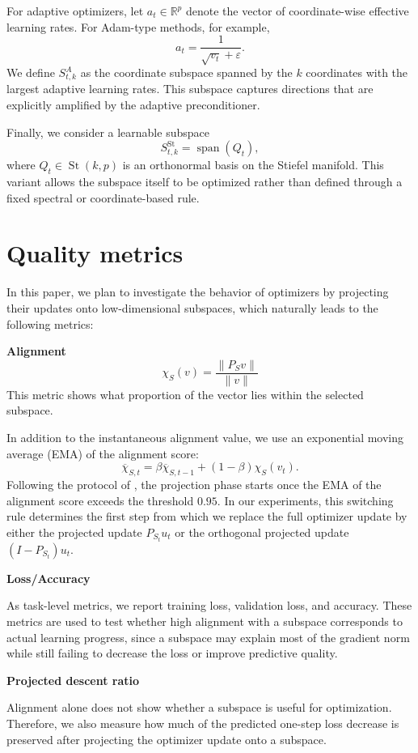 \documentclass[conference]{IEEEtran}
\begin{document}
For adaptive optimizers, let $a_t \in \mathbb{R}^p$ denote the vector of coordinate-wise effective learning rates. For Adam-type methods, for example,
\[
a_t = \frac{1}{\sqrt{v_t} + \varepsilon}.
\]
We define $S_{t,k}^{A}$ as the coordinate subspace spanned by the $k$ coordinates with the largest adaptive learning rates. This subspace captures directions that are explicitly amplified by the adaptive preconditioner.

Finally, we consider a learnable subspace
\[
S_{t,k}^{\mathrm{St}} = \operatorname{span}(Q_t),
\]
where $Q_t \in \operatorname{St}(k,p)$ is an orthonormal basis on the Stiefel manifold. This variant allows the subspace itself to be optimized rather than defined through a fixed spectral or coordinate-based rule.




\section{Quality metrics}

In this paper, we plan to investigate the behavior of optimizers by projecting their updates onto low-dimensional subspaces, which naturally leads to the following metrics:

\textbf{Alignment}
\[
\chi_S(v) = \frac{\|P_S v\|}{\|v\|}
\]
This metric shows what proportion of the vector lies within the selected subspace.

In addition to the instantaneous alignment value, we use an exponential moving average (EMA) of the alignment score:
\[
\overline{\chi}_{S,t}
=
\beta \overline{\chi}_{S,t-1}
+
(1-\beta)\chi_S(v_t).
\]
Following the protocol of \citet{SongDoesSGD}, the projection phase starts once the EMA of the alignment score exceeds the threshold $0.95$. In our experiments, this switching rule determines the first step from which we replace the full optimizer update by either the projected update $P_{S_t}u_t$ or the orthogonal projected update $(I-P_{S_t})u_t$.

\textbf{Loss/Accuracy} 

As task-level metrics, we report training loss, validation loss, and accuracy. These metrics are used to test whether high alignment with a subspace corresponds to actual learning progress, since a subspace may explain most of the gradient norm while still failing to decrease the loss or improve predictive quality.

\textbf{Projected descent ratio}

Alignment alone does not show whether a subspace is useful for optimization. 
Therefore, we also measure how much of the predicted one-step loss decrease is preserved after projecting the optimizer update onto a subspace.
\end{document}
